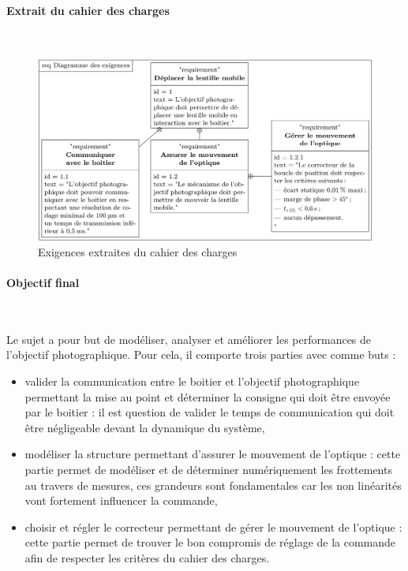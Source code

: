 \newpage

\paragraph{Extrait du cahier des charges} ~\

\begin{figure}[!h]
\centering\includegraphics[width=0.9\linewidth]{img/figure_06}
 \caption{Exigences extraites du cahier des charges}
 \label{img06}
\end{figure}

\paragraph{Objectif final} ~\

Le sujet a pour but de modéliser, analyser et améliorer les performances de l'objectif photographique. Pour cela, il comporte trois parties avec comme buts :
\begin{itemize}
 \item valider la communication entre le boitier et l'objectif photographique permettant la mise au point et déterminer la consigne qui doit être envoyée par le boitier : il est question de valider le temps de communication qui doit être négligeable devant la dynamique du système,
 \item modéliser la structure permettant d'\og assurer le mouvement de l'optique \fg : cette partie permet de modéliser et de déterminer numériquement les frottements au travers de mesures, ces grandeurs sont fondamentales car les non linéarités vont fortement influencer la commande,
 \item choisir et régler le correcteur permettant de \og gérer le mouvement de l'optique \fg : cette partie permet de trouver le bon compromis de réglage de la commande afin de respecter les critères du cahier des charges.
\end{itemize}

